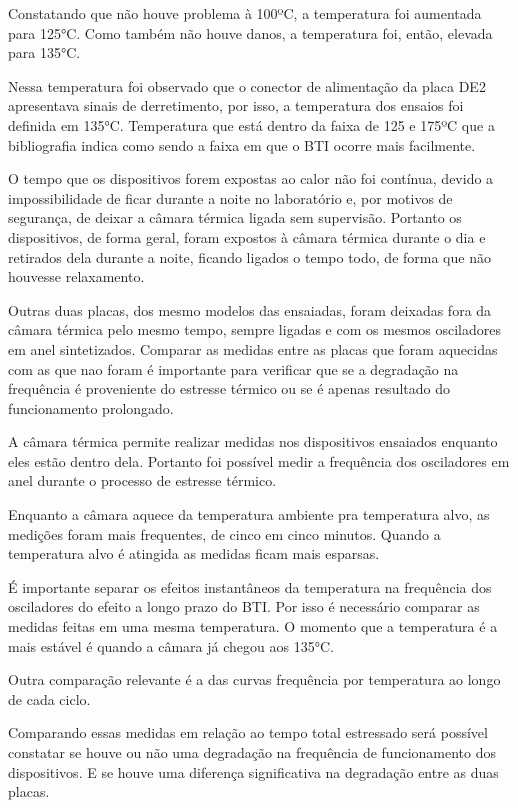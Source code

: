 Constatando que não houve problema à 100ºC, a temperatura foi aumentada para 125°C. Como também não houve danos, a temperatura foi, então, elevada para 135°C.

Nessa temperatura foi observado que o conector de alimentação da placa DE2 apresentava sinais de derretimento, por isso, a temperatura dos ensaios foi definida em 135°C. Temperatura que está dentro da faixa de 125 e 175ºC que a bibliografia indica como sendo a faixa em que o BTI ocorre mais facilmente.

O tempo que os dispositivos forem expostas ao calor não foi contínua, devido a impossibilidade de ficar durante a noite no laboratório e, por motivos de segurança, de deixar a câmara térmica ligada sem supervisão. Portanto os dispositivos, de forma geral, foram expostos à câmara térmica durante o dia e retirados dela durante a noite, ficando ligados o tempo todo, de forma que não houvesse relaxamento.

Outras duas placas, dos mesmo modelos das ensaiadas, foram deixadas fora da câmara térmica pelo mesmo tempo, sempre ligadas e com os mesmos osciladores em anel sintetizados. Comparar as medidas entre as placas que foram aquecidas com as que nao foram é importante para verificar que se a degradação na frequência é proveniente do estresse térmico ou se é apenas resultado do funcionamento prolongado.

A câmara térmica permite realizar medidas nos dispositivos ensaiados enquanto eles estão dentro dela. Portanto foi possível medir a frequência dos osciladores em anel durante o processo de estresse térmico.

Enquanto a câmara aquece da temperatura ambiente pra temperatura alvo, as medições foram mais frequentes, de cinco em cinco minutos. Quando a temperatura alvo é atingida as medidas ficam mais esparsas.

É importante separar os efeitos instantâneos da temperatura na frequência dos osciladores do efeito a longo prazo do BTI. Por isso é necessário comparar as medidas feitas em uma mesma temperatura. O momento que a temperatura é a mais estável é quando a câmara já chegou aos 135°C.

Outra comparação relevante é a das curvas frequência por temperatura ao longo de cada ciclo.

Comparando essas medidas em relação ao tempo total estressado será possível constatar se houve ou não uma degradação na frequência de funcionamento dos dispositivos. E se houve uma diferença significativa na degradação entre as duas placas.

